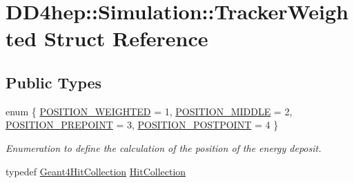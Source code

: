 \hypertarget{struct_d_d4hep_1_1_simulation_1_1_tracker_weighted}{}\section{D\+D4hep\+:\+:Simulation\+:\+:Tracker\+Weighted Struct Reference}
\label{struct_d_d4hep_1_1_simulation_1_1_tracker_weighted}
\subsection*{Public Types}
\begin{DoxyCompactItemize}
\item 
enum \{ \hyperlink{struct_d_d4hep_1_1_simulation_1_1_tracker_weighted_a8cdc474134c1f8b3a8344e32fc3d4421a675d7a02b8891bd8f45bc5f27c5c1746}{P\+O\+S\+I\+T\+I\+O\+N\+\_\+\+W\+E\+I\+G\+H\+T\+ED} = 1, 
\hyperlink{struct_d_d4hep_1_1_simulation_1_1_tracker_weighted_a8cdc474134c1f8b3a8344e32fc3d4421a4b7f40d92a4823d71b75c6894d032489}{P\+O\+S\+I\+T\+I\+O\+N\+\_\+\+M\+I\+D\+D\+LE} = 2, 
\hyperlink{struct_d_d4hep_1_1_simulation_1_1_tracker_weighted_a8cdc474134c1f8b3a8344e32fc3d4421a1419a617e564f58140744d38381ee4c1}{P\+O\+S\+I\+T\+I\+O\+N\+\_\+\+P\+R\+E\+P\+O\+I\+NT} = 3, 
\hyperlink{struct_d_d4hep_1_1_simulation_1_1_tracker_weighted_a8cdc474134c1f8b3a8344e32fc3d4421ac0ca75f525d337568debb34bf3545e29}{P\+O\+S\+I\+T\+I\+O\+N\+\_\+\+P\+O\+S\+T\+P\+O\+I\+NT} = 4
 \}\begin{DoxyCompactList}\small\item\em Enumeration to define the calculation of the position of the energy deposit. \end{DoxyCompactList}
\item 
typedef \hyperlink{class_d_d4hep_1_1_simulation_1_1_geant4_hit_collection}{Geant4\+Hit\+Collection} \hyperlink{struct_d_d4hep_1_1_simulation_1_1_tracker_weighted_a99a4be34af7901b0aab7398894ba906a}{Hit\+Collection}
\end{DoxyCompactItemize}
